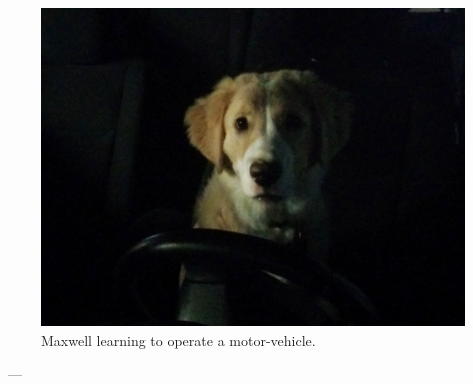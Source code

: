 \begin{titlepage}
    \begin{center}
        \ %
        \textsc{\huge \thetitle}\\
        \HRule\\[1em]

        \begin{figure}[h!]
            \centering
            \includegraphics[width=.75\textwidth]{./images/max/title.jpg}
            \caption*{Maxwell learning to operate a motor-vehicle.}
            \label{fig:max_title}
        \end{figure}

        \vfill
        {%
            \large \theauthor\  --- \large \thedate%
        }%

    \end{center}
\end{titlepage}
